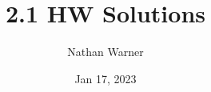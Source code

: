 \documentclass{report}
\title{\Huge{2.1 HW Solutions}}
\author{\huge{Nathan Warner}}
\date{\huge{Jan 17, 2023}}
\begin{document}
    \maketitle
    \section{\Large{}}
\end{document}
